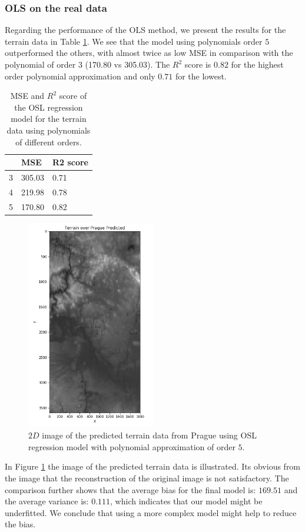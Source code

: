 \documentclass [11pt]{article}
\begin{document}
\subsubsection{OLS on the real data}
Regarding the performance of the OLS method, we present the results for the terrain data in Table \ref{tab:olsTerrain}. We see that the model using polynomials order $5$ outperformed the others, with almost twice as low MSE in comparison with the polynomial of order $3$ (170.80 vs 305.03). The $R^{2}$ score is $0.82$ for the highest order polynomial approximation and only $0.71$ for the lowest. 
\begin{table}[H]
\centering
\begin{tabular}{lll}
\hline
  & MSE    & R2 score \\ \hline
3 & 305.03 & 0.71      \\
4 & 219.98 & 0.78     \\
5 & 170.80 & 0.82     \\ \hline
\end{tabular}
\caption{MSE and $R^{2}$ score of the OSL regression model for the terrain data using polynomials of different orders.}
\label{tab:olsTerrain}
\end{table}

\begin{figure}[H]
\centering
\includegraphics[width=0.5\textwidth]{figures/TerrainPraguePred.png}
        \caption{$2D$ image of the predicted terrain data from Prague using OSL regression model with polynomial approximation of order $5$.}
        \label{fig:TerrainPraguePred}
\end{figure}
In Figure \ref{fig:TerrainPraguePred} the image of the predicted terrain data is illustrated. Its obvious from the image that the reconstruction of the original image is not satisfactory. The comparison further shows that the average bias for the final model is: $169.51$ and the average variance is: $0.111$, which indicates that our model might be underfitted. We conclude that using a more complex model might help to reduce the bias.
\end{document}
